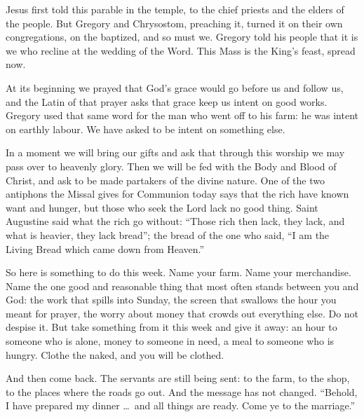 \bigskip

Jesus first told this parable in the temple, to the chief priests and the
elders of the people. But Gregory and Chrysostom, preaching it, turned it on
their own congregations, on the baptized, and so must we. Gregory told his
people that it is we who recline at the wedding of the Word. This Mass is the
King's feast, spread now.

At its beginning we prayed that God's grace would go before us and follow us,
and the Latin of that prayer asks that grace keep us intent on good works.
Gregory used that same word for the man who went off to his farm: he was
intent on earthly labour. We have asked to be intent on something else.

In a moment we will bring our gifts and ask that through this worship we may
pass over to heavenly glory. Then we will be fed with the Body and Blood of
Christ, and ask to be made partakers of the divine nature. One of the two
antiphons the Missal gives for Communion today says that the rich have known
want and hunger, but those who seek the Lord lack no good thing. Saint
Augustine said what the rich go without: ``Those rich then lack, they lack,
and what is heavier, they lack bread''; the bread of the one who said, ``I am
the Living Bread which came down from Heaven.''

\bigskip

So here is something to do this week. Name your farm. Name your merchandise.
Name the one good and reasonable thing that most often stands between you and
God: the work that spills into Sunday, the screen that swallows the hour you
meant for prayer, the worry about money that crowds out everything else. Do
not despise it. But take something from it this week and give it away: an
hour to someone who is alone, money to someone in need, a meal to someone who
is hungry. Clothe the naked, and you will be clothed.

And then come back. The servants are still being sent: to the farm, to the
shop, to the places where the roads go out. And the message has not changed.
``Behold, I have prepared my dinner \ldots\ and all things are ready. Come ye
to the marriage.''
